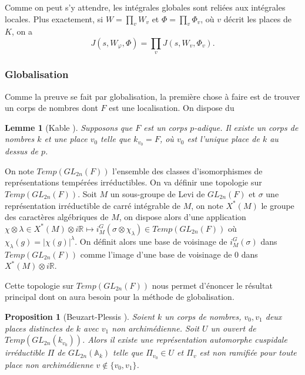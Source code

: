 \documentclass{amsart}
\newtheorem{proposition}{Proposition}[section]
\newtheorem{lemme}{Lemme}[section]
\begin{document}
 Comme on peut s'y attendre, les intégrales globales sont reliées aux intégrales locales. Plus exactement, si $W=\prod_v W_v$ et $\Phi = \prod_v \Phi_v$, où $v$ décrit les places de $K$, on a
 \begin{equation}
 J(s,W_\varphi,\Phi)=\prod_v J(s, W_v, \Phi_v).
 \end{equation}
 
 \subsubsection{Globalisation}
 
 Comme la preuve se fait par globalisation, la première chose à faire est de trouver un corps de nombres dont $F$ est une localisation. On dispose du
 \begin{lemme}[Kable \cite{kable}]
 \label{corpsglobal}
 Supposons que $F$ est un corps $p$-adique. Il existe un corps de nombres $k$ et une place $v_0$ telle que $k_{v_0} = F$, où $v_0$ est l'unique place de $k$ au dessus de $p$.
 \end{lemme}
 
 On note $Temp(GL_{2n}(F))$ l'ensemble des classes d'isomorphismes de représentations tempérées irréductibles. On va définir une topologie sur $Temp(GL_{2n}(F))$. Soit $M$ un sous-groupe de Levi de $GL_{2n}(F)$ et $\sigma$ une représentation irréductible de carré intégrable de $M$, on note $X^*(M)$ le groupe des caractères algébriques de $M$, on dispose alors d'une application $\chi \otimes \lambda \in X^*(M) \otimes i\mathbb{R} \mapsto i^G_M(\sigma \otimes \chi_\lambda) \in Temp(GL_{2n}(F))$ où $\chi_\lambda(g) = |\chi(g)|^\lambda$. On définit alors une base de voisinage de $i^G_M(\sigma)$ dans $Temp(GL_{2n}(F))$ comme l'image d'une base de voisinage de $0$ dans $X^*(M) \otimes i\mathbb{R}$.
 
 Cette topologie sur $Temp(GL_{2n}(F))$ nous permet d'énoncer le résultat principal dont on aura besoin pour la méthode de globalisation.
 \begin{proposition}[Beuzart-Plessis \cite{beuzart-plessis}]
 \label{globalisation}
 Soient $k$ un corps de nombres, $v_0,v_1$ deux places distinctes de $k$ avec $v_1$ non archimédienne. Soit $U$ un ouvert de $Temp(GL_{2n}(k_{v_0}))$. Alors il existe une représentation automorphe cuspidale irréductible $\Pi$ de $GL_{2n}(\mathbb{A}_k)$ telle que $\Pi_{v_0} \in U$ et $\Pi_v$ est non ramifiée pour toute place non archimédienne $v \not \in \{v_0,v_1\}$.
 \end{proposition}
 
\end{document}
